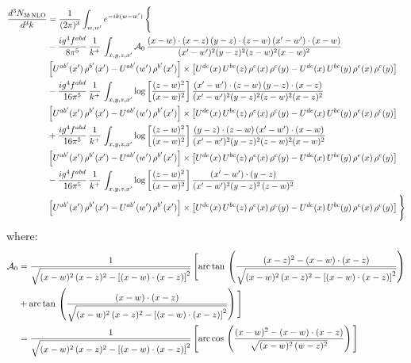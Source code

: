 \documentclass[9pt]{article}
\numberwithin{equation}{section}
\begin{document}
\begin{align}
\frac{d^{3}N_{3b\,\rm NLO}}{d^{3}k} & = \frac{1}{(2\pi)^{3}}\int_{w,w'}e^{-ik(w-w')}\,\Bigg\{\notag \\
&-\frac{ig^{4}f^{abd}}{8\pi^{5}}\,\frac{1}{k^{+}}\,\int_{x,y,z,x'}\mathcal{A}_{0}\,
\frac{(x-w)\cdot(x-z)\,(y-z)\cdot(z-w)\,(x'-w')\cdot(x-w)}{(x'-w')^{2}(y-z)^{2}(z-w)^{2}(x-w)^{2}}\notag \\ & \left[U^{ab'}(x')\,\rho^{b'}(x')-U^{ab'}(w')\, \rho^{b'}(x')\right]\times \left[U^{de}(x)\,U^{bc}(z)\, \rho^{e}(x)\,\rho^{c}(y)-U^{de}(x)\,U^{bc}(y)\,\rho^{e}(x)\,\rho^{c}(y)\right] \notag \\
& -\frac{ig^{4}f^{abd}}{16\pi^{5}}\,\frac{1}{k^{+}}\,\int_{x,y,z,x'}\log{\left[\frac{(z-w)^{2}}{(x-w)^{2}}\right]}\,
\frac{(x'-w')\cdot(z-w)\,(y-z)\cdot(x-z)}{(x'-w')^{2}(y-z)^{2}(z-w)^{2}(x-z)^{2}}\notag \\
&\left[U^{ab'}(x')\,\rho^{b'}(x')-U^{ab'}(w')\, \rho^{b'}(x')\right]\times \left[U^{de}(x)\,U^{bc}(z)\, \rho^{e}(x)\,\rho^{c}(y)-U^{de}(x)\,U^{bc}(y)\,\rho^{e}(x)\,\rho^{c}(y)\right] \notag \\
&+ \frac{ig^{4}f^{abd}}{16\pi^{5}}\,\frac{1}{k^{+}}\,\int_{x,y,z,x'}\log{\left[\frac{(z-w)^{2}}{(x-w)^{2}}\right]}\,
\frac{(y-z)\cdot(z-w)\,(x'-w')\cdot(x-w)}{(x'-w')^{2}(y-z)^{2}(z-w)^{2}(x-w)^{2}}\notag \\ 
& \left[U^{ab'}(x')\,\rho^{b'}(x')-U^{ab'}(w')\, \rho^{b'}(x')\right]\times \left[U^{de}(x)\,U^{bc}(z)\, \rho^{e}(x)\,\rho^{c}(y)-U^{de}(x)\,U^{bc}(y)\,\rho^{e}(x)\,\rho^{c}(y)\right]\notag \\ &  -\frac{ig^{4}f^{abd}}{16\pi^{5}}\,\frac{1}{k^{+}}\,\int_{x,y,z,x'}\log{\left[\frac{(z-w)^{2}}{(x-w)^{2}}\right]}\,\frac{(x'-w')\cdot(y-z)}{(x'-w')^{2}(y-z)^{2}\,(z-w)^{2}}\notag \\ & \left[U^{ab'}(x')\,\rho^{b'}(x')-U^{ab'}(w')\, \rho^{b'}(x')\right]\times \left[U^{de}(x)\,U^{bc}(z)\, \rho^{e}(x)\,\rho^{c}(y)-U^{de}(x)\,U^{bc}(y)\,\rho^{e}(x)\,\rho^{c}(y)\right]\Bigg\}
\end{align}
where: \begin{align}
\mathcal{A}_{0} & = \frac{1}{\sqrt{(x-w)^{2}\,(x-z)^{2}-\left[(x-w)\cdot (x-z)\right]^{2}}}\, \Bigg[\mathrm{arc\,tan}\,\left(\frac{(x-z)^{2}-(x-w)\cdot (x-z)}{\sqrt{(x-w)^{2}\,(x-z)^{2}-\left[(x-w)\cdot (x-z)\right]^{2}}}\right)\notag \\ & + \mathrm{arc\,tan}\,\left(\frac{(x-w)\cdot (x-z)}{\sqrt{(x-w)^{2}\,(x-z)^{2}-\left[(x-w)\cdot (x-z)\right]^{2}}}\right) \Bigg]\notag \\ & = \frac{1}{\sqrt{(x-w)^{2}\,(x-z)^{2}-\left[(x-w)\cdot (x-z)\right]^{2}}}\, \Bigg[\mathrm{arc\,cos}\,\left(\frac{(x-w)^{2}-(x-w)\cdot (x-z)}{\sqrt{(x-w)^{2}\,(w-z)^{2}}}\right)\Bigg]
\end{align}
\end{document}
